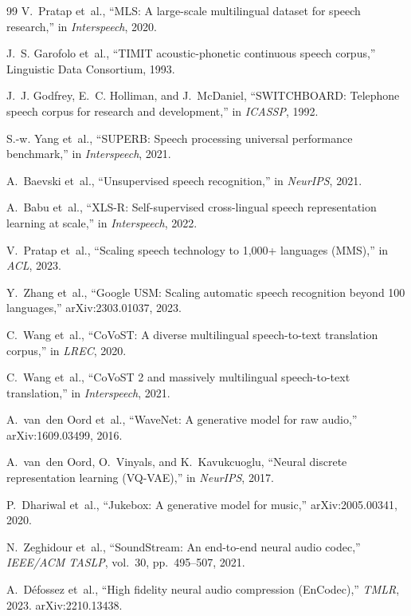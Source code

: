 \begin{thebibliography}{99}
V.~Pratap et~al., ``MLS: A large-scale multilingual dataset for speech
research,'' in \emph{Interspeech}, 2020.

J.~S. Garofolo et~al., ``TIMIT acoustic-phonetic continuous speech corpus,''
Linguistic Data Consortium, 1993.

J.~J. Godfrey, E.~C. Holliman, and J.~McDaniel, ``SWITCHBOARD: Telephone speech
corpus for research and development,'' in \emph{ICASSP}, 1992.

S.-w. Yang et~al., ``SUPERB: Speech processing universal performance
benchmark,'' in \emph{Interspeech}, 2021.

A.~Baevski et~al., ``Unsupervised speech recognition,'' in \emph{NeurIPS}, 2021.

A.~Babu et~al., ``XLS-R: Self-supervised cross-lingual speech representation
learning at scale,'' in \emph{Interspeech}, 2022.

V.~Pratap et~al., ``Scaling speech technology to 1,000+ languages (MMS),'' in
\emph{ACL}, 2023.

Y.~Zhang et~al., ``Google USM: Scaling automatic speech recognition beyond 100
languages,'' arXiv:2303.01037, 2023.

C.~Wang et~al., ``CoVoST: A diverse multilingual speech-to-text translation
corpus,'' in \emph{LREC}, 2020.

C.~Wang et~al., ``CoVoST 2 and massively multilingual speech-to-text
translation,'' in \emph{Interspeech}, 2021.

A.~van~den Oord et~al., ``WaveNet: A generative model for raw audio,''
arXiv:1609.03499, 2016.

A.~van~den Oord, O.~Vinyals, and K.~Kavukcuoglu, ``Neural discrete representation
learning (VQ-VAE),'' in \emph{NeurIPS}, 2017.

P.~Dhariwal et~al., ``Jukebox: A generative model for music,''
arXiv:2005.00341, 2020.

N.~Zeghidour et~al., ``SoundStream: An end-to-end neural audio codec,''
\emph{IEEE/ACM TASLP}, vol.~30, pp.~495--507, 2021.

A.~D\'efossez et~al., ``High fidelity neural audio compression (EnCodec),''
\emph{TMLR}, 2023. arXiv:2210.13438.


\end{thebibliography}
